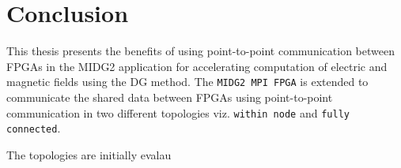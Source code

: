 \chapter{Conclusion}
\label{cha:Conclusion}

This thesis presents the benefits of using point-to-point communication between
FPGAs in the MIDG2 application for accelerating computation of electric and magnetic
fields using the \acl{DG} method. The \texttt{MIDG2 MPI FPGA} is extended to communicate
the shared data between FPGAs using point-to-point communication in two different
topologies viz. \texttt{within node} and \texttt{fully connected}.

The topologies are initially evalau


